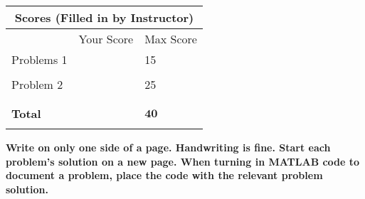 \documentclass[letterpaper]{article}
\begin{document}
\newpage

\vspace*{1in}



\begin{center}
\begin{tabular}{|p{2in}|p{1in}|p{1in}|}
\hline
\multicolumn{3}{|c|}{\textbf{Scores (Filled in by Instructor)}}\\
\hline
 & Your Score& Max Score \\
\hline
Problems 1&  &   15\\
\hline
& &  \\
\hline
Problem 2 &  &   25\\
\hline
& &  \\
\hline
& & \\
\hline
\textbf{Total} &  &   $\mathbf{40}$\\
\hline
& & \\
\hline
%
\end{tabular}
\end{center}

\vspace{5cm}

\begin{center}
\LARGE \bf
Write on only one side of a page. Handwriting is fine. Start each problem's solution on a new page. When turning in MATLAB code to document a problem, place the code with the relevant problem solution.
\end{center}

\newpage
\end{document}
